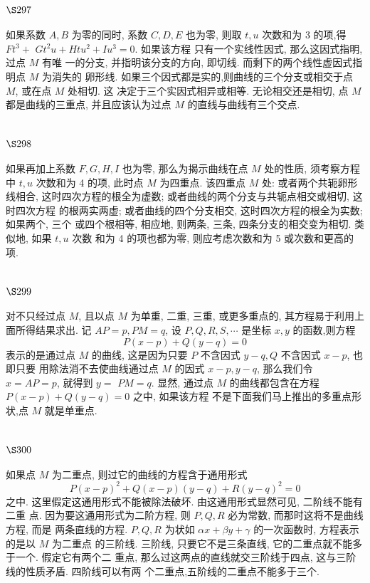 \section{$\S 297$}

如果系数 $A, B$ 为零的同时, 系数 $C, D, E$ 也为零, 则取 $t, u$ 次数和为 3 的项,得 $F t^{3}+$ $G t^{2} u+H t u^{2}+I u^{3}=0$. 如果该方程 只有一个实线性因式, 那么这因式指明, 过点 $M$ 有唯 一的分支, 并指明该分支的方向, 即切线. 而剩下的两个线性虚因式指明点 $M$ 为消失的 卵形线. 如果三个因式都是实的,则曲线的三个分支或相交于点 $M$, 或在点 $M$ 处相切. 这 决定于三个实因式相异或相等. 无论相交还是相切, 点 $M$ 都是曲线的三重点, 并且应该认为过点 $M$ 的直线与曲线有三个交点.

\section{$\S 298$}

如果再加上系数 $F, G, H, I$ 也为零, 那么为揭示曲线在点 $M$ 处的性质, 须考察方程 中 $t, u$ 次数和为 4 的项, 此时点 $M$ 为四重点. 该四重点 $M$ 处: 或者两个共轭卵形线相合, 这时四次方程的根全为虚数; 或者曲线的两个分支与共轭点相交或相切, 这时四次方程 的根两实两虚; 或者曲线的四个分支相交, 这时四次方程的根全为实数; 如果两个, 三个 或四个根相等, 相应地, 则两条, 三条, 四条分支的相交变为相切. 类似地, 如果 $t, u$ 次数 和为 4 的项也都为零, 则应考虑次数和为 5 或次数和更高的项.

\section{$\S 299$}

对不只经过点 $M$, 且以点 $M$ 为单重, 二重, 三重, 或更多重点的, 其方程易于利用上 面所得结果求出. 记 $A P=p, P M=q$, 设 $P, Q, R, S, \cdots$ 是坐标 $x, y$ 的函数,则方程
\[
P(x-p)+Q(y-q)=0
\]
表示的是通过点 $M$ 的曲线, 这是因为只要 $P$ 不含因式 $y-q, Q$ 不含因式 $x-p$, 也即只要 用除法消不去使曲线通过点 $M$ 的因式 $x-p, y-q$, 那么我们令 $x=A P=p$, 就得到 $y=$ $P M=q$. 显然, 通过点 $M$ 的曲线都包含在方程 $P(x-p)+Q(y-q)=0$ 之中, 如果该方程 不是下面我们马上推出的多重点形状,点 $M$ 就是单重点.

\section{$\S 300$}

如果点 $M$ 为二重点, 则过它的曲线的方程含于通用形式
\[
P(x-p)^{2}+Q(x-p)(y-q)+R(y-q)^{2}=0
\]
之中. 这里假定这通用形式不能被除法破坏. 由这通用形式显然可见, 二阶线不能有二重 点. 因为要这通用形式为二阶方程, 则 $P, Q, R$ 必为常数, 而那时这将不是曲线方程, 而是 两条直线的方程. $P, Q, R$ 为状如 $\alpha x+\beta y+\gamma$ 的一次函数时, 方程表示的是以 $M$ 为二重点 的三阶线. 三阶线, 只要它不是三条直线, 它的二重点就不能多于一个. 假定它有两个二 重点, 那么过这两点的直线就交三阶线于四点, 这与三阶线的性质矛盾. 四阶线可以有两 个二重点,五阶线的二重点不能多于三个.

